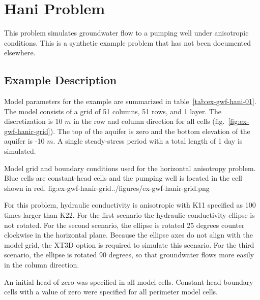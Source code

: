 \section{Hani Problem}

This problem simulates groundwater flow to a pumping well under anisotropic conditions.  This is a synthetic example problem that has not been documented elsewhere. 

\subsection{Example Description}
Model parameters for the example are summarized in table~\ref{tab:ex-gwf-hani-01}. The model consists of a grid of 51 columns, 51 rows, and 1 layer. The discretization is 10 $m$ in the row and column direction for all cells (fig.~\ref{fig:ex-gwf-hanir-grid}). The top of the aquifer is zero and the bottom elevation of the aquifer is -10 $m$. A single steady-stress period with a total length of 1 day is simulated.


\begin{StandardFigure}{
                                     Model grid and boundary conditions used for the horizontal anisotropy problem.  Blue cells are constant-head cells and the pumping well is located in the cell shown in red.
                                     }{fig:ex-gwf-hanir-grid}{../figures/ex-gwf-hanir-grid.png}
\end{StandardFigure}                                 




For this problem, hydraulic conductivity is anisotropic with K11 specified as 100 times larger than K22.  For the first scenario the hydraulic conductivity ellipse is not rotated.  For the second scenario, the ellipse is rotated 25 degrees counter clockwise in the horizontal plane.  Because the ellipse axes do not align with the model grid, the XT3D option \citep{modflow6xt3d} is required to simulate this scenario.  For the third scenario, the ellipse is rotated 90 degrees, so that groundwater flows more easily in the column direction.  



An initial head of zero was specified in all model cells. Constant head boundary cells with a value of zero were specified for all perimeter model cells.

